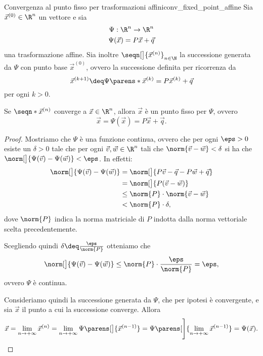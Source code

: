 \begin{theorem}
    {Convergenza al punto fisso per trasformazioni affini}{conv_fixed_point_affine}
    Sia $\vec x^{(0)} \in \R^n$ un vettore e sia \begin{gather*}
        \Psi : \R^n \to \R^n\\
        \Psi(\vec x) = P\vec x + \vec q 
    \end{gather*} una trasformazione affine.
    Sia inoltre $\seqn[\big]{\vec x^{(n)}}_{n \in \N}$ la successione generata da $\Psi$ con punto base $\vec x^{(0)}$, ovvero la successione definita per ricorrenza da \[
        \vec x^{(k+1)} \deq \Psi\parens*{\vec x^{(k)}} = P\vec x^{(k)} + \vec q
    \] per ogni $k > 0$. 

    Se $\seqn*{\vec x^{(n)}}$ converge a $\vec x \in \R^n$, allora $\vec x$ è un punto fisso per $\Psi$, ovvero \[
        \vec x = \Psi(\vec x) = P\vec x + \vec q.
    \] 
\end{theorem}
\begin{proof}
    Mostriamo che $\Psi$ è una funzione continua, ovvero che per ogni $\eps > 0$ esiste un $\delta > 0$ tale che per ogni $\vec v, \vec w \in \R^n$ tali che $\norm{\vec v - \vec w} < \delta$ si ha che $\norm[\big]{\Psi(\vec v) - \Psi(\vec w)} < \eps$. In effetti:
    \begin{align*}
        \norm[\big]{\Psi(\vec v) - \Psi(\vec w)}
        &= \norm[\big]{P\vec v - \vec q - P\vec w + \vec q}\\
        &= \norm[\big]{P(\vec v - \vec w)}\\
        &\leq \norm{P} \cdot \norm{\vec v - \vec w}\\
        &< \norm{P} \cdot \delta,
    \end{align*} dove $\norm{P}$ indica la norma matriciale di $P$ indotta dalla norma vettoriale scelta precedentemente.
    
    Scegliendo quindi $\delta \deq \frac{\eps}{\norm{P}}$ otteniamo che \[
        \norm[\big]{\Psi(\vec v) - \Psi(\vec w)} \leq \norm{P} \cdot \frac{\eps}{\norm{P}} = \eps,
    \] ovvero $\Psi$ è continua.

    Consideriamo quindi la successione generata da $\Psi$, che per ipotesi è convergente, e sia $\vec x$ il punto a cui la successione converge. Allora \[
        \vec x 
        = \lim_{n \to +\infty} \vec x^{(n)} 
        = \lim_{n \to +\infty} \Psi\parens[\big]{\vec x^{(n-1)}}
        = \Psi\parens[\Bigg]{\lim_{n \to +\infty} \vec x^{(n-1)}}
        = \Psi(\vec x). \qedhere
    \]
\end{proof}

